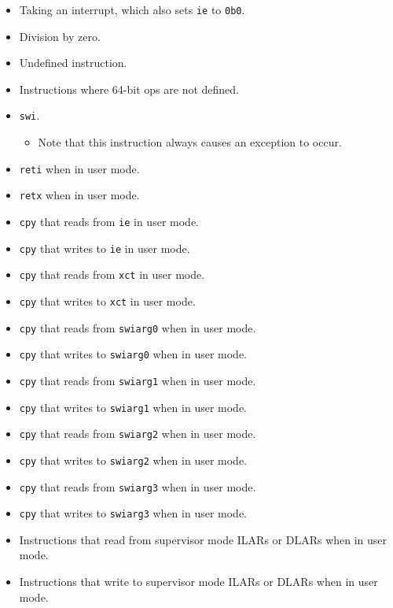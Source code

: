 \documentclass{article}
\begin{document}
	\begin{itemize}
	\item Taking an interrupt, which also sets \texttt{ie} to \texttt{0b0}.
	\item Division by zero.
	\item Undefined instruction.
	\item Instructions where 64-bit ops are not defined.

	\item \texttt{swi}.
		\begin{itemize}
		\item Note that this instruction always causes an exception to
		occur.
		\end{itemize}

	\item \texttt{reti} when in user mode.
	\item \texttt{retx} when in user mode.

	\item \texttt{cpy} that reads from \texttt{ie} in user mode.
	\item \texttt{cpy} that writes to \texttt{ie} in user mode.
	\item \texttt{cpy} that reads from \texttt{xct} in user mode.
	\item \texttt{cpy} that writes to \texttt{xct} in user mode.

	\item \texttt{cpy} that reads from \texttt{swiarg0} when in user mode.
	\item \texttt{cpy} that writes to \texttt{swiarg0} when in user mode.
	\item \texttt{cpy} that reads from \texttt{swiarg1} when in user mode.
	\item \texttt{cpy} that writes to \texttt{swiarg1} when in user mode.

	\item \texttt{cpy} that reads from \texttt{swiarg2} when in user mode.
	\item \texttt{cpy} that writes to \texttt{swiarg2} when in user mode.
	\item \texttt{cpy} that reads from \texttt{swiarg3} when in user mode.
	\item \texttt{cpy} that writes to \texttt{swiarg3} when in user mode.

	\item Instructions that read from supervisor mode ILARs or DLARs when
	in user mode.
	\item Instructions that write to supervisor mode ILARs or DLARs when in
	user mode.
	\end{itemize}
	\newpage
\end{document}
